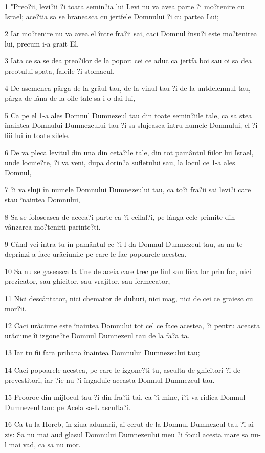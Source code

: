 \par 1 "Preo?ii, levi?ii ?i toata semin?ia lui Levi nu va avea parte ?i mo?tenire cu Israel; ace?tia sa se hraneasca cu jertfele Domnului ?i cu partea Lui;
\par 2 Iar mo?tenire nu va avea el între fra?ii sai, caci Domnul însu?i este mo?tenirea lui, precum i-a grait El.
\par 3 Iata ce sa se dea preo?ilor de la popor: cei ce aduc ca jertfa boi sau oi sa dea preotului spata, falcile ?i stomacul.
\par 4 De asemenea pârga de la grâul tau, de la vinul tau ?i de la untdelemnul tau, pârga de lâna de la oile tale sa i-o dai lui,
\par 5 Ca pe el 1-a ales Domnul Dumnezeul tau din toate semin?iile tale, ca sa stea înaintea Domnului Dumnezeului tau ?i sa slujeasca întru numele Domnului, el ?i fiii lui în toate zilele.
\par 6 De va pleca levitul din una din ceta?ile tale, din tot pamântul fiilor lui Israel, unde locuie?te, ?i va veni, dupa dorin?a sufletului sau, la locul ce 1-a ales Domnul,
\par 7 ?i va sluji în numele Domnului Dumnezeului tau, ca to?i fra?ii sai levi?i care stau înaintea Domnului,
\par 8 Sa se foloseasca de aceea?i parte ca ?i ceilal?i, pe lânga cele primite din vânzarea mo?tenirii parinte?ti.
\par 9 Când vei intra tu în pamântul ce ?i-l da Domnul Dumnezeul tau, sa nu te deprinzi a face urâciunile pe care le fac popoarele acestea.
\par 10 Sa nu se gaseasca la tine de aceia care trec pe fiul sau fiica lor prin foc, nici prezicator, sau ghicitor, sau vrajitor, sau fermecator,
\par 11 Nici descântator, nici chemator de duhuri, nici mag, nici de cei ce graiesc cu mor?ii.
\par 12 Caci urâciune este înaintea Domnului tot cel ce face acestea, ?i pentru aceasta urâciune îi izgone?te Domnul Dumnezeul tau de la fa?a ta.
\par 13 Iar tu fii fara prihana înaintea Domnului Dumnezeului tau;
\par 14 Caci popoarele acestea, pe care le izgone?ti tu, asculta de ghicitori ?i de prevestitori, iar ?ie nu-?i îngaduie aceasta Domnul Dumnezeul tau.
\par 15 Prooroc din mijlocul tau ?i din fra?ii tai, ca ?i mine, î?i va ridica Domnul Dumnezeul tau: pe Acela sa-L asculta?i.
\par 16 Ca tu la Horeb, în ziua adunarii, ai cerut de la Domnul Dumnezeul tau ?i ai zis: Sa nu mai aud glasul Domnului Dumnezeului meu ?i focul acesta mare sa nu-l mai vad, ca sa nu mor.
